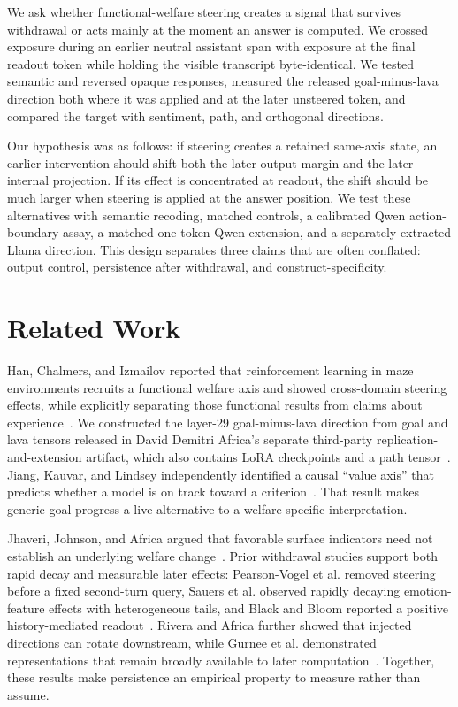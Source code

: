 \documentclass[10pt,twocolumn]{article}
\begin{document}
We ask whether functional-welfare steering creates a signal that survives withdrawal or acts mainly at the moment an answer is computed. We crossed exposure during an earlier neutral assistant span with exposure at the final readout token while holding the visible transcript byte-identical. We tested semantic and reversed opaque responses, measured the released goal-minus-lava direction both where it was applied and at the later unsteered token, and compared the target with sentiment, path, and orthogonal directions.

Our hypothesis was as follows: if steering creates a retained same-axis state, an earlier intervention should shift both the later output margin and the later internal projection. If its effect is concentrated at readout, the shift should be much larger when steering is applied at the answer position. We test these alternatives with semantic recoding, matched controls, a calibrated Qwen action-boundary assay, a matched one-token Qwen extension, and a separately extracted Llama direction. This design separates three claims that are often conflated: output control, persistence after withdrawal, and construct-specificity.

\section{Related Work}

Han, Chalmers, and Izmailov reported that reinforcement learning in maze environments recruits a functional welfare axis and showed cross-domain steering effects, while explicitly separating those functional results from claims about experience~\cite{han2026}. We constructed the layer-29 goal-minus-lava direction from goal and lava tensors released in David Demitri Africa's separate third-party replication-and-extension artifact, which also contains LoRA checkpoints and a path tensor~\cite{africa2026}. Jiang, Kauvar, and Lindsey independently identified a causal ``value axis'' that predicts whether a model is on track toward a criterion~\cite{jiang2026}. That result makes generic goal progress a live alternative to a welfare-specific interpretation.

Jhaveri, Johnson, and Africa argued that favorable surface indicators need not establish an underlying welfare change~\cite{jhaveri2026}. Prior withdrawal studies support both rapid decay and measurable later effects: Pearson-Vogel et al. removed steering before a fixed second-turn query, Sauers et al. observed rapidly decaying emotion-feature effects with heterogeneous tails, and Black and Bloom reported a positive history-mediated readout~\cite{pearsonvogel2026,sauers2026,black2026}. Rivera and Africa further showed that injected directions can rotate downstream, while Gurnee et al. demonstrated representations that remain broadly available to later computation~\cite{rivera2026,gurnee2026}. Together, these results make persistence an empirical property to measure rather than assume.
\end{document}

